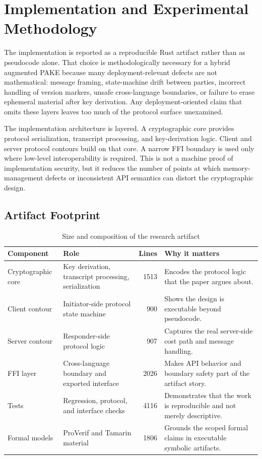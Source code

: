\documentclass[conference]{IEEEtran}
\begin{document}
\section{Implementation and Experimental Methodology}

The implementation is reported as a reproducible Rust artifact rather than as pseudocode alone. That choice is methodologically necessary for a hybrid augmented PAKE because many deployment-relevant defects are not mathematical: message framing, state-machine drift between parties, incorrect handling of version markers, unsafe cross-language boundaries, or failure to erase ephemeral material after key derivation. Any deployment-oriented claim that omits these layers leaves too much of the protocol surface unexamined.

The implementation architecture is layered. A cryptographic core provides protocol serialization, transcript processing, and key-derivation logic. Client and server protocol contours build on that core. A narrow FFI boundary is used only where low-level interoperability is required. This is not a machine proof of implementation security, but it reduces the number of points at which memory-management defects or inconsistent API semantics can distort the cryptographic design.

\subsection{Artifact Footprint}

\begin{table}[t]
\caption{Size and composition of the research artifact}
\label{tab:acit-codebase}
\centering
\footnotesize
\begin{tabularx}{\textwidth}{@{}L{3.2cm}L{3.0cm}rY@{}}
\toprule
Component & Role & Lines & Why it matters \\
\midrule
Cryptographic core & Key derivation, transcript processing, serialization & 1513 & Encodes the protocol logic that the paper argues about. \\
Client contour & Initiator-side protocol state machine & 900 & Shows the design is executable beyond pseudocode. \\
Server contour & Responder-side protocol logic & 907 & Captures the real server-side cost path and message handling. \\
FFI layer & Cross-language boundary and exported interface & 2026 & Makes API behavior and boundary safety part of the artifact story. \\
Tests & Regression, protocol, and interface checks & 4116 & Demonstrates that the work is reproducible and not merely descriptive. \\
Formal models & ProVerif and Tamarin material & 1806 & Grounds the scoped formal claims in executable symbolic artifacts. \\
\bottomrule
\end{tabularx}
\end{table}
\end{document}

